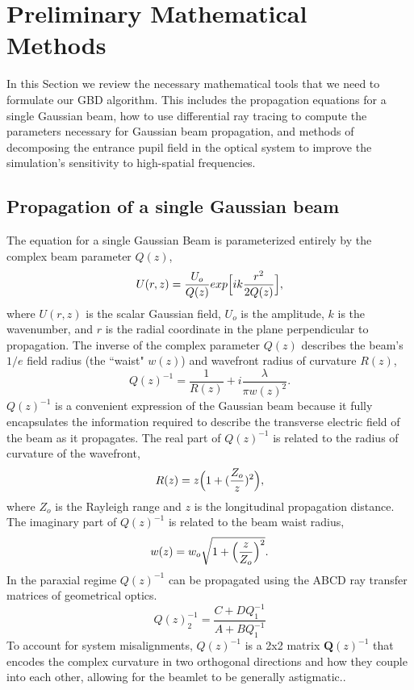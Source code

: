 \section{Preliminary Mathematical Methods}
\label{sec:methods}  %

In this Section we review the necessary mathematical tools that we need to formulate our GBD algorithm. This includes the propagation equations for a single Gaussian beam, how to use differential ray tracing to compute the parameters necessary for Gaussian beam propagation, and methods of decomposing the entrance pupil field in the optical system to improve the simulation's sensitivity to high-spatial frequencies. 

\subsection{Propagation of a single Gaussian beam}
The equation for a single Gaussian Beam is parameterized entirely by the complex beam parameter $Q(z)$, \cite{goodman17}
\begin{equation}
	U(r,z) = \frac{U_o}{Q(z)}exp\Bigl[ik\frac{r^2}{2Q(z)}\Bigr],
\end{equation}
where $U(r,z)$ is the scalar Gaussian field, $U_o$ is the amplitude, $k$ is the wavenumber, and $r$ is the radial coordinate in the plane perpendicular to propagation. The inverse of the complex parameter $Q(z)$ describes the beam's $1/e$ field radius (the ``waist" $w(z)$) and wavefront radius of curvature $R(z)$,
\begin{equation}
	Q(z)^{-1} = \frac{1}{R(z)}+i\frac{\lambda}{\pi w(z)^2}.
\end{equation}	
$Q(z)^{-1}$ is a convenient expression of the Gaussian beam because it fully encapsulates the information required to describe the transverse electric field of the beam as it propagates. The real part of $Q(z)^{-1}$ is related to the radius of curvature of the wavefront,
\begin{equation}
    R(z) = z\Bigl(1+(\frac{Z_o}{z})^2\Bigr),
    \label{eq:complex_curvature}
\end{equation}
where $Z_o$ is the Rayleigh range and $z$ is the longitudinal propagation distance.
The imaginary part of $Q(z)^{-1}$ is related to the beam waist radius,
\begin{equation}
	w(z) = w_o\sqrt{1+\Bigl(\frac{z}{Z_o}\Bigr)^2}.
\end{equation}
In the paraxial regime $Q(z)^{-1}$ can be propagated using the ABCD ray transfer matrices of geometrical optics\cite{Siegman_1986}.
\begin{equation}
    Q(z)^{-1}_{2} = \frac{C + DQ_{1}^{-1}}{A + BQ_{1}^{-1}}
    \label{eq:propq}
\end{equation}
To account for system misalignments, $Q(z)^{-1}$ is a 2x2 matrix $\textbf{Q}(z)^{-1}$ that encodes the complex curvature in two orthogonal directions and how they couple into each other, allowing for the beamlet to be generally astigmatic.\cite{Ashcraft2020,cai_decentered_nodate}. 

